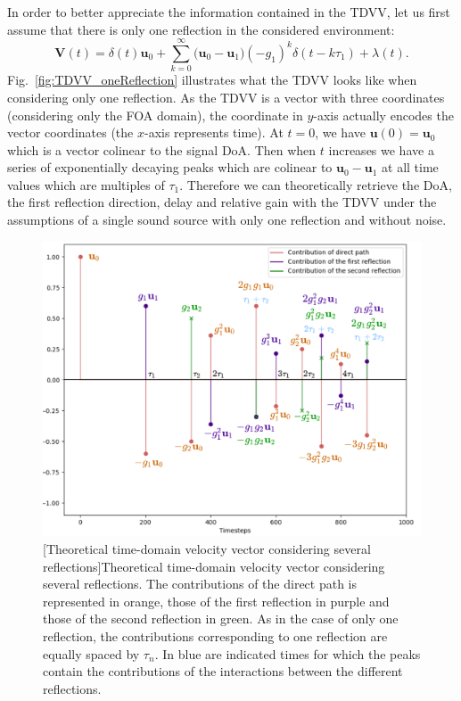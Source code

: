 In order to better appreciate the information contained in the TDVV, let us first assume that there is only one reflection in the considered environment:
\begin{equation}
    \mathbf{V}(t) = \delta(t) \mathbf{u}_0 + \sum_{k=0}^{\infty} \Big(\mathbf{u}_0 - \mathbf{u}_1\Big) (-g_1)^k \delta(t-k \tau_1) + \lambda(t).
\end{equation}
Fig.~\ref{fig:TDVV_oneReflection} illustrates what the TDVV looks like when considering only one reflection. As the TDVV is a vector with three coordinates (considering only the FOA domain), the coordinate in $y$-axis actually encodes the vector coordinates (the $x$-axis represents time). At $t=0$, we have $\mathbf{u}(0) = \mathbf{u}_0$ which is a vector colinear to the signal DoA. Then when $t$ increases we have a series of exponentially decaying peaks which are colinear to $\mathbf{u}_0 - \mathbf{u}_1$ at all time values which are multiples of $\tau_1$. Therefore we can theoretically retrieve the DoA, the first reflection direction, delay and relative gain with the TDVV under the assumptions of a single sound source with only one reflection and without noise.

\begin{figure}[t]
    \begin{center}
    \includegraphics[width=0.8\linewidth]{Images/chap2/tdvv_2reflection_annote.png}
    [Theoretical time-domain velocity vector considering several reflections]{Theoretical time-domain velocity vector considering several reflections. The contributions of the direct path is represented in orange, those of the first reflection in purple and those of the second reflection in green. As in the case of only one reflection, the contributions corresponding to one reflection are equally spaced by $\tau_n$. In blue are indicated times for which the peaks contain the contributions of the interactions between the different reflections.}
    \label{fig:TDVV_twoReflections}
    \end{center}
\end{figure}

